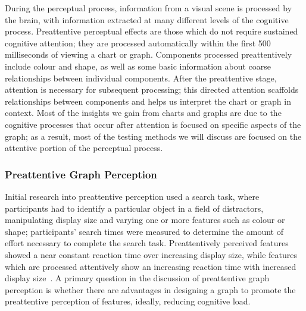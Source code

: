 \documentclass[letterpaper]{ar-1col}\usepackage[]{graphicx}\usepackage[]{color}
\begin{document}
During the perceptual process, information from a visual scene is processed by the brain, with information extracted at many different levels of the cognitive process. Preattentive perceptual effects are those which do not require sustained cognitive attention; they are processed automatically within the first 500 milliseconds of viewing a chart or graph. Components processed preattentively include colour and shape, as well as some basic information about coarse relationships between individual components. After the preattentive stage, attention is necessary for subsequent processing; this directed attention scaffolds relationships between components and helps us interpret the chart or graph in context. Most of the insights we gain from charts and graphs are due to the cognitive processes that occur after attention is focused on specific aspects of the graph; as a result, most of the testing methods we will discuss are focused on the attentive portion of the perceptual process.

\subsubsection{Preattentive Graph Perception} %

Initial research into preattentive perception used a search task, where participants had to identify a particular object in a field of distractors, manipulating display size and varying one or more features such as colour or shape; participants' search times were measured to determine the amount of effort necessary to complete the search task. Preattentively perceived features showed a near constant reaction time over increasing display size, while features which are processed attentively show an increasing reaction time with increased display size~\citep{treismanFeatureIntegrationTheoryAttention1980}. A primary question in the discussion of preattentive graph perception is whether there are advantages in designing a graph to promote the preattentive perception of features, ideally, reducing cognitive load.
\end{document}
